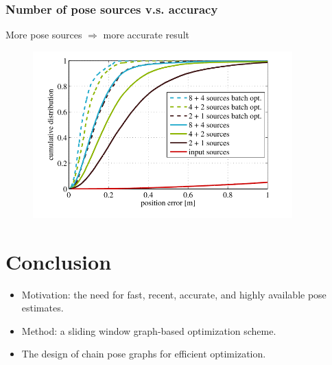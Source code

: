 \documentclass[letterpaper,11pt]{article}
\begin{document}
\subsubsection{Number of pose sources v.s. accuracy}
More pose sources $\Rightarrow$ more accurate result
\begin{figure}[!ht]
	\centering
	\includegraphics[width=10cm]{./img/sources.png}
\end{figure}

\section{Conclusion}
\begin{itemize}
	\item Motivation: the need for fast, recent, accurate, and highly available pose estimates.
	\item Method: a sliding window graph-based optimization scheme.
	\item The design of chain pose graphs for efficient optimization.
\end{itemize}
\end{document}
